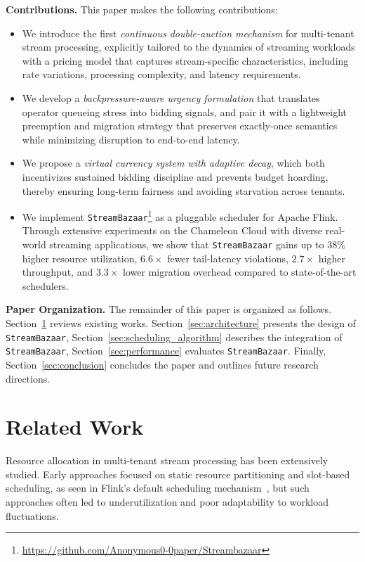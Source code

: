 \documentclass[lettersize,journal]{IEEEtran}
\begin{document}
\textbf{Contributions.} This paper makes the following contributions:

\begin{itemize}[leftmargin=*,wide]
    \item[\textbf{C1)}] We introduce the first \emph{continuous double-auction mechanism} for multi-tenant stream processing, explicitly tailored to the dynamics of streaming workloads with a pricing model that captures stream-specific characteristics, including rate variations, processing complexity, and latency requirements.

    
    \item[\textbf{C2)}] We develop a \emph{backpressure-aware urgency formulation} that translates operator queueing stress into bidding signals, and pair it with a lightweight preemption and migration strategy that preserves exactly-once semantics while minimizing disruption to end-to-end latency.
    
    \item[\textbf{C3)}] We propose a \emph{virtual currency system with adaptive decay}, which both incentivizes sustained bidding discipline and prevents budget hoarding, thereby ensuring long-term fairness and avoiding starvation across tenants.
    
    \item[\textbf{C4)}] We implement \texttt{StreamBazaar}\footnote{\url{https://github.com/Anonymous0-0paper/Streambazaar}} as a pluggable scheduler for Apache Flink. Through extensive experiments on the Chameleon Cloud with diverse real-world streaming applications, we show that \texttt{StreamBazaar} gains up to $38\%$ higher resource utilization, $6.6\times$ fewer tail-latency violations, $2.7\times$ higher throughput, and $3.3\times$ lower migration overhead compared to state-of-the-art schedulers.
\end{itemize}


\textbf{Paper Organization.} 
The remainder of this paper is organized as follows. 
Section~\ref{sec:related} reviews existing works.
Section~\ref{sec:architecture} presents the design of \texttt{StreamBazaar},
Section~\ref{sec:scheduling_algorithm} describes the integration of \texttt{StreamBazaar},
Section~\ref{sec:performance} evaluates \texttt{StreamBazaar}.
Finally, Section~\ref{sec:conclusion} concludes the paper and outlines future research directions.


\section{Related Work}
\label{sec:related}
Resource allocation in multi-tenant stream processing has been extensively studied. Early approaches focused on static resource partitioning and slot-based scheduling, as seen in Flink’s default scheduling mechanism~\cite{carbone2015apache,10.1007/s10586-025-05808-w}, but such approaches often led to underutilization and poor adaptability to workload fluctuations. 
\end{document}
